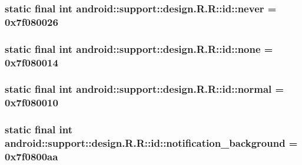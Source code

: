 \hypertarget{classandroid_1_1support_1_1design_1_1_r_1_1id_4214a17a08a94cf329f237fc85e621eb}{
\subsubsection[{never}]{\setlength{\rightskip}{0pt plus 5cm}static final int android::support::design.R.R::id::never = 0x7f080026}}
\label{classandroid_1_1support_1_1design_1_1_r_1_1id_4214a17a08a94cf329f237fc85e621eb}


\hypertarget{classandroid_1_1support_1_1design_1_1_r_1_1id_9dfd8c32c01a1a53163a1271bc908aa5}{
\subsubsection[{none}]{\setlength{\rightskip}{0pt plus 5cm}static final int android::support::design.R.R::id::none = 0x7f080014}}
\label{classandroid_1_1support_1_1design_1_1_r_1_1id_9dfd8c32c01a1a53163a1271bc908aa5}


\hypertarget{classandroid_1_1support_1_1design_1_1_r_1_1id_02f781e01d0d704f12c251251b95f50a}{
\subsubsection[{normal}]{\setlength{\rightskip}{0pt plus 5cm}static final int android::support::design.R.R::id::normal = 0x7f080010}}
\label{classandroid_1_1support_1_1design_1_1_r_1_1id_02f781e01d0d704f12c251251b95f50a}


\hypertarget{classandroid_1_1support_1_1design_1_1_r_1_1id_0d079e4787c2edd34bdd2a93a86abad9}{
\subsubsection[{notification\_\-background}]{\setlength{\rightskip}{0pt plus 5cm}static final int android::support::design.R.R::id::notification\_\-background = 0x7f0800aa}}
\label{classandroid_1_1support_1_1design_1_1_r_1_1id_0d079e4787c2edd34bdd2a93a86abad9}


